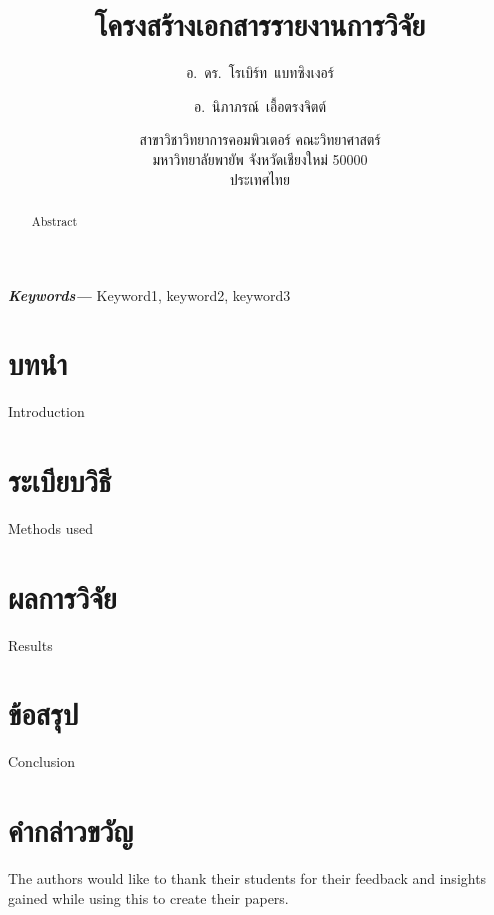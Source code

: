 \documentclass[10pt,twocolumn,twoside,a4paper]{article}
\title{โครงสร้างเอกสารรายงานการวิจัย}
\author{อ.~ดร.~โรเบิร์ท~แบทซิงเงอร์\and
อ.~นิภาภรณ์~เอื้อตรงจิตต์}%
\date{สาขาวิชาวิทยาการคอมพิวเตอร์ คณะวิทยาศาสตร์\\
    มหาวิทยาลัยพายัพ จังหวัดเชียงใหม่ 50000\\
    ประเทศไทย}
\providecommand{\keywords}[1]{\noindent\textbf{\textit{Keywords---}} #1}
\begin{document}
\thispagestyle{empty}%
\maketitle

\begin{abstract}
Abstract
\end{abstract}

\bigskip
\keywords{Keyword1, keyword2, keyword3}

\section{บทนำ}
\label{introduction}
Introduction

\section{ระเบียบวิธี}
\label{methodology}
Methods used


\section{ผลการวิจัย}
\label{results}
Results

\section{ข้อสรุป}
\label{conclusion}
Conclusion

\section*{คำกล่าวขวัญ}
\label{Acknowledgment}
The authors would like to thank their students for their feedback and insights gained while using this to create their papers.



\vfill
\end{document}
